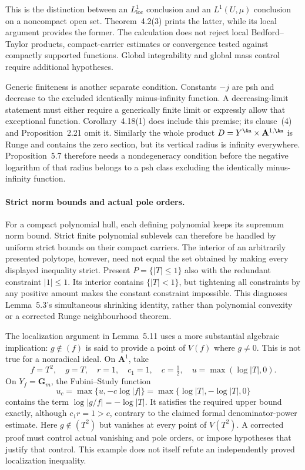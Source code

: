 This is the distinction between an \(L^1_{\mathrm{loc}}\) conclusion
and an \(L^1(U,\mu)\) conclusion on a noncompact open set. Theorem~4.2(3)
prints the latter, while its local argument provides the former.
The calculation does not reject local Bedford--Taylor products,
compact-carrier estimates or convergence tested against compactly
supported functions. Global integrability and global mass control
require additional hypotheses.

Generic finiteness is another separate condition. Constants \(-j\)
are psh and decrease to the excluded identically minus-infinity
function. A decreasing-limit statement must either require a
generically finite limit or expressly allow that exceptional function.
Corollary~4.18(1) does include this premise; its clause~(4) and
Proposition~2.21 omit it. Similarly the whole product
\(D=Y^{\An}\times\mathbf A^{1,\An}\) is Runge and contains the zero
section, but its vertical radius is infinity everywhere.
Proposition~5.7 therefore needs a nondegeneracy condition before the
negative logarithm of that radius belongs to a psh class excluding
the identically minus-infinity function.

\paragraph{Strict norm bounds and actual pole orders.}
For a compact polynomial hull, each defining polynomial keeps its
supremum norm bound. Strict finite polynomial sublevels can therefore
be handled by uniform strict bounds on their compact carriers.
The interior of an arbitrarily presented polytope, however, need not
equal the set obtained by making every displayed inequality strict.
Present \(P=\{|T|\leq1\}\) also with the redundant constraint
\(|1|\leq1\). Its interior contains \(\{|T|<1\}\), but tightening
all constraints by any positive amount makes the constant constraint
impossible. This diagnoses Lemma~5.3's simultaneous shrinking
identity, rather than polynomial convexity or a corrected Runge
neighbourhood theorem.

The localization argument in Lemma~5.11 uses a more substantial
algebraic implication: \(g\notin(f)\) is said to provide a point of
\(V(f)\) where \(g\ne0\). This is not true for a nonradical ideal.
On \(\mathbf A^1\), take
\[
 f=T^2,\quad g=T,\quad r=1,\quad c_1=1,\quad c=\tfrac12,\quad
 u=\max(\log|T|,0).
\]
On \(Y_f=\mathbf G_m\), the Fubini--Study function
\[
 u_c=\max\{u,-c\log|f|\}
     =\max\{\log|T|,-\log|T|,0\}
\]
contains the term \(\log|g/f|=-\log|T|\). It satisfies the required
upper bound exactly, although \(c_1r=1>c\), contrary to the claimed
formal denominator-power estimate. Here \(g\notin(T^2)\) but vanishes
at every point of \(V(T^2)\). A corrected proof must control actual
vanishing and pole orders, or impose hypotheses that justify that
control. This example does not itself refute an independently proved
localization inequality.


